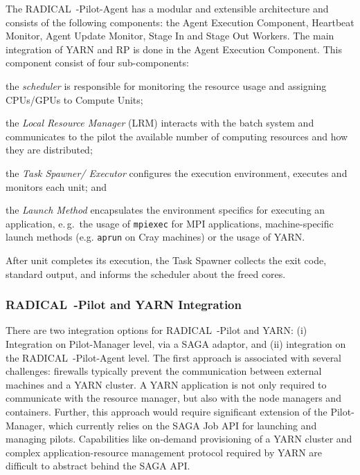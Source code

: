 The RADICAL~-Pilot-Agent has a modular and extensible architecture and consists of the following components: the Agent Execution Component, Heartbeat Monitor, Agent Update Monitor, Stage In and Stage Out Workers.
The main integration of YARN and RP is done in the Agent Execution Component.
This component consist of four sub-components:
\begin{inparaenum}[a)]
    \item the \textit{scheduler} is responsible for monitoring the resource usage and assigning CPUs/GPUs to Compute Units;
    \item the \textit{Local Resource Manager} (LRM) interacts with the batch system and communicates to the pilot the available number of computing resources and how they are distributed;
    \item the \textit{Task Spawner/ Executor} configures the execution environment, executes and monitors each unit; and
    \item the \textit{Launch Method} encapsulates the environment specifics for executing an application, e.\,g.\ the usage of \texttt{mpiexec} for MPI applications, machine-specific launch methods (e.g. \texttt{aprun} on Cray machines) or the usage of YARN.
\end{inparaenum}
After unit completes its execution, the Task Spawner collects the exit code, standard output, and informs the scheduler about the freed cores.

\subsubsection*{RADICAL~-Pilot and YARN Integration}
\label{sssec:rp-yarn}

There are two integration options for RADICAL~-Pilot and YARN: (i) Integration on Pilot-Manager level, via a SAGA adaptor, and (ii) integration on the RADICAL~-Pilot-Agent level.
The first approach is associated with several challenges: firewalls typically prevent the communication between external machines and a YARN cluster.
A YARN application is not only required to communicate with the resource manager, but also with the node managers and containers.
Further, this approach would require significant extension of the Pilot-Manager, which currently relies on the SAGA Job API for launching and managing pilots.
Capabilities like on-demand provisioning of a YARN cluster and complex application-resource management protocol required by YARN are difficult to abstract behind the SAGA API.

